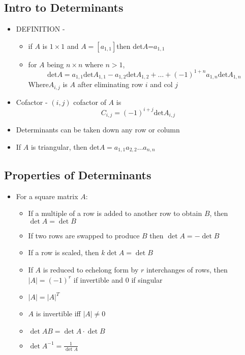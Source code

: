 \documentclass{article}
\begin{document}
\subsection{Intro to Determinants}
\begin{itemize}
    \item DEFINITION - 
    \begin{itemize}
        \item if \(A\) is \(1\times 1\) and \(A=[a_{1,1}]\)then det\(A\)=\(a_{1,1}\)
        \item for \(A\) being \(n\times n\) where \(n>1\), \[\mbox{det}A=a_{1,1}\mbox{det}A_{1,1}-a_{1,2}\mbox{det}A_{1,2}+\dots+(-1)^{1+n}a_{1,n}\mbox{det}A_{1,n}\] 
        Where\(A_{i,j}\) is \(A\) after eliminating row \(i\) and col \(j\) 
    \end{itemize}
    \item Cofactor - \((i,j)\) cofactor of \(A\) is \[C_{i,j}=(-1)^{i+j}\mbox{det}A_{i,j}\]
    \item Determinants can be taken down any row or column 
    \item If \(A\) is triangular, then \(\mbox{det}A=a_{1,1}a_{2,2}\dots a_{n,n}\)
\end{itemize}

\subsection{Properties of Determinants}
\begin{itemize}
    \item For a square matrix \(A\):
    \begin{itemize} 
        \item If a multiple of a row is added to another row to obtain \(B\), then \(\det{A}=\det{B}\) 
        \item If two rows are swapped to produce \(B\) then \(\det{A}=-\det{B}\)
        \item If a row is scaled, then \(k\det{A}=\det{B}\)
        \item If \(A\) is reduced to echelong form by \(r\) interchanges of rows, then \(|A|=(-1)^r\) if invertible and 0 if singular 
        \item \(|A|=|A|^T\)
        \item \(A\) is invertible iff \(|A|\neq 0\)
        \item \(\det{AB}=\det{A}\cdot\det{B}\)
        \item \(\det{A^{-1}}=\frac{1}{\det{A}}\)
    \end{itemize}
\end{itemize}
\end{document}
